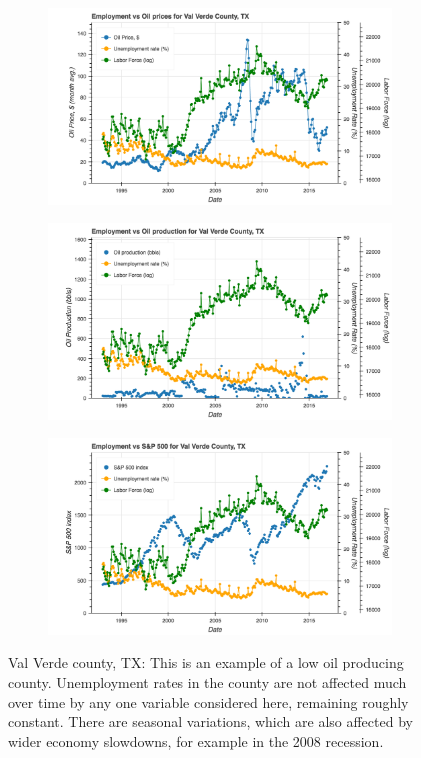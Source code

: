 \documentclass[11pt,letterpaper]{article}
\begin{document}
\begin{figure}
\centering
\begin{subfigure}{0.6\textwidth}
\includegraphics[width=\linewidth]{tx_valverde_oil_price}
\end{subfigure}

\begin{subfigure}{0.6\textwidth}
\includegraphics[width=\linewidth]{tx_valverde_oil_prod}
\end{subfigure}

\begin{subfigure}{0.6\textwidth}
\includegraphics[width=\linewidth]{tx_valverde_snp}
\end{subfigure}
\caption{Val Verde county, TX: This is an example of a low oil producing county. Unemployment rates in the county are not affected much over time by any one variable considered here, remaining roughly constant. There are seasonal variations, which are also affected by wider economy slowdowns, for example in the 2008 recession.}
\label{fig:tx_valverde}
\end{figure}
\end{document}
